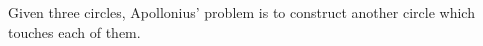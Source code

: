 Given three circles, Apollonius' problem is to construct another 
circle which touches each of them.